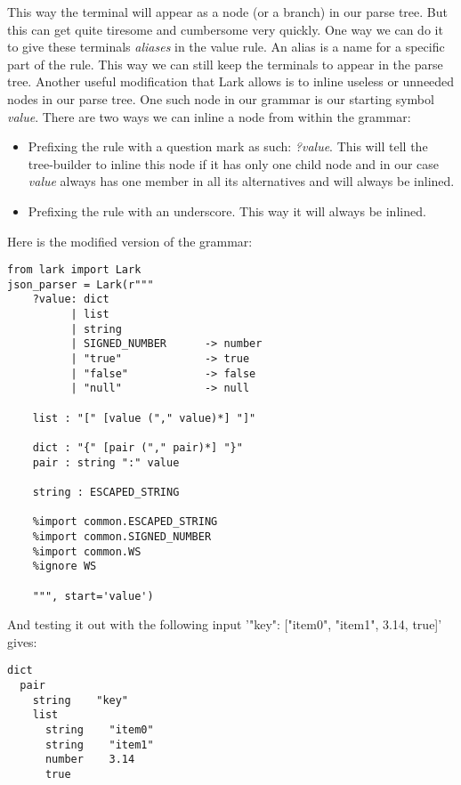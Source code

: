 \documentclass[12pt]{article}
\begin{document}
This way the terminal will appear as a node (or a branch)  in our parse tree. But this can get quite tiresome and cumbersome very quickly. One way we can do it to give these terminals \emph{aliases} in the value rule. An alias is a name for a specific part of the rule. This way we can still keep the terminals to appear in the parse tree. 
Another useful modification that Lark allows is to inline useless or unneeded nodes in our parse tree. One such node in our grammar is our starting symbol \emph{value}. There are two ways we can inline a node from within the grammar:
\begin{itemize}
    \item Prefixing the rule with a question mark as such: \emph{?value}. This will tell the tree-builder to inline this node if it has only one child node and in our case \emph{value} always has one member in all its alternatives and will always be inlined.
    
    \item Prefixing the rule with an underscore. This way it will always be inlined.

\end{itemize}

Here is the modified version of the grammar:

\begin{lstlisting}
from lark import Lark
json_parser = Lark(r"""
    ?value: dict
          | list
          | string
          | SIGNED_NUMBER      -> number
          | "true"             -> true
          | "false"            -> false
          | "null"             -> null

    list : "[" [value ("," value)*] "]"

    dict : "{" [pair ("," pair)*] "}"
    pair : string ":" value

    string : ESCAPED_STRING

    %import common.ESCAPED_STRING
    %import common.SIGNED_NUMBER
    %import common.WS
    %ignore WS

    """, start='value')

\end{lstlisting}

And testing it out with the following input '{"key": ["item0", "item1", 3.14, true]}' gives:

\begin{lstlisting}
dict
  pair
    string    "key"
    list
      string    "item0"
      string    "item1"
      number    3.14
      true
\end{lstlisting}
\end{document}
